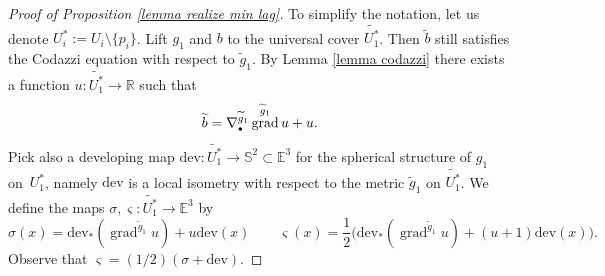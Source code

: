 \documentclass[11pt]{article}
\makeatletter
\newcommand{\sbullet}{{\scriptscriptstyle\bullet}}
\DeclareRobustCommand{\mathbbm}[1]{\csname jepbb@#1\endcsname}
\theoremstyle{definition}
\newcommand{\R}{{\mathbb R}}
\newcommand{\E}{\mathbb{E}}
\newcommand{\dev}{\mathrm{dev}}
\DeclareMathOperator{\grad}{grad}
\makeatother
\begin{document}
\begin{proof}[Proof of Proposition \ref{lemma realize min lag}]
To simplify the notation, let us denote $U_i^*:=U_i\setminus\{p_i\}$.
Lift $g_1$ and $b$ to the universal cover $\widetilde{U_1^*}$. Then $\widetilde b$ still satisfies the Codazzi equation with respect to $\widetilde g_1$. By Lemma \ref{lemma codazzi} there exists a function $u:\widetilde {U_1^*}\to\R$ such that
\[
\widetilde b=\nabla^{\widetilde g_1}_\sbullet\grad^{\widetilde g_1} u+u\mathbbm 1.
\]
Pick also a developing map $\dev:\widetilde {U_1^*}\to\mathbb S^2\subset\E^3$ for the spherical structure of $g_1$ on~$U_1^*$, namely $\dev$ is a local isometry with respect to the metric $\widetilde g_1$ on $\widetilde {U_1^*}$. We define the maps $\sigma,\varsigma:\widetilde {U_1^*}\to\E^3$ by
\[
\sigma(x)=\dev_*(\grad^{\widetilde g_1}u)+u\dev(x) \qquad \varsigma(x)=\frac{1}{2}\bigl(\dev_*(\grad^{\widetilde g_1}u)+(u+1)\dev(x) \bigr).
\]
Observe that $\varsigma=(1/2)(\sigma+\dev)$.


\end{proof}
\end{document}
